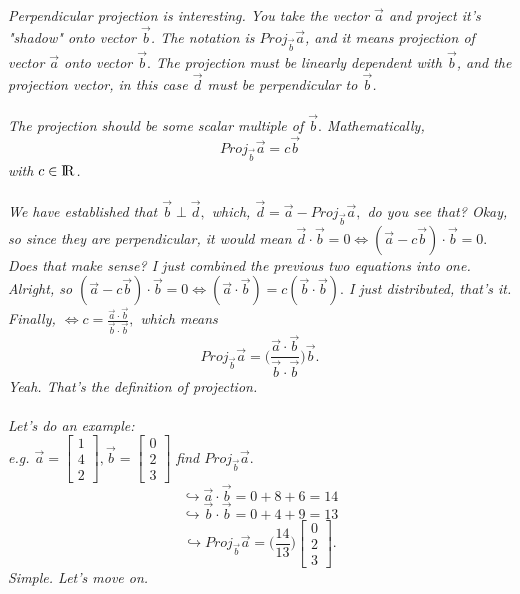 \documentclass[addpoints]{exam}
\begin{document}
\textit{Perpendicular projection is interesting. You take the vector $\vec{a}$ and project it's "shadow" onto vector $\vec{b}$. The notation is $Proj_{\vec{b}}\vec{a}$, and it means projection of vector $\vec{a}$ onto vector $\vec{b}.$ The projection must be linearly dependent with $\vec{b}$, and the projection vector, in this case $\vec{d}$ must be perpendicular to $\vec{b}$. \\\\
The projection should be some scalar multiple of $\vec{b}.$ Mathematically, \[
Proj_{\vec{b}}\vec{a}=c\vec{b}
\] with $c\in{\rm I\!R}$.\\\\}
\textit{We have established that $\vec{b}\perp\vec{d},$ which, $\vec{d}=\vec{a}-Proj_{\vec{b}}\vec{a},$ do you see that? Okay, so since they are perpendicular, it would mean $\vec{d}\cdot\vec{b}=0\Leftrightarrow(\vec{a}-c\vec{b})\cdot\vec{b}=0.$ Does that make sense? I just combined the previous two equations into one. Alright, so $(\vec{a}-c\vec{b})\cdot\vec{b}=0\Leftrightarrow(\vec{a}\cdot\vec{b})=c(\vec{b}\cdot\vec{b}).$ I just distributed, that's it. Finally, $\Leftrightarrow c=\frac{\vec{a}\cdot\vec{b}}{\vec{b}\cdot\vec{b}},$ which means} 
\[Proj_{\vec{b}}\vec{a}=\Big(\frac{\vec{a}\cdot\vec{b}}{\vec{b}\cdot\vec{b}}\Big)\vec{b}.\]
\pagebreak\textit{Yeah. That's the definition of projection.}\\\\
\textit{
Let's do an example:\\e.g.
$\vec{a}=\begin{bmatrix}
    1\\4\\2
\end{bmatrix},\vec{b}=\begin{bmatrix}
    0\\2\\3
\end{bmatrix}$ find $Proj_{\vec{b}}\vec{a}.$
}
\[
\hookrightarrow \vec{a}\cdot\vec{b} = 0+8+6 =14\]\[\hookrightarrow \vec{b}\cdot\vec{b}=0+4+9=13
\]
\[
\hookrightarrow Proj_{\vec{b}}\vec{a}=\Big(\frac{14}{13}\Big)\begin{bmatrix}
    0\\2\\3
\end{bmatrix}.
\]
\textit{
Simple. Let's move on.
}
\end{document}
